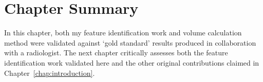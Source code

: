 
\clearpage
\newpage

\section{Chapter Summary}

In this chapter, both my feature identification work and volume calculation method were validated against `gold standard' results produced in collaboration with a radiologist. The next chapter critically assesses both the feature identification work validated here and the other original contributions claimed in Chapter~\ref{chap:introduction}.
